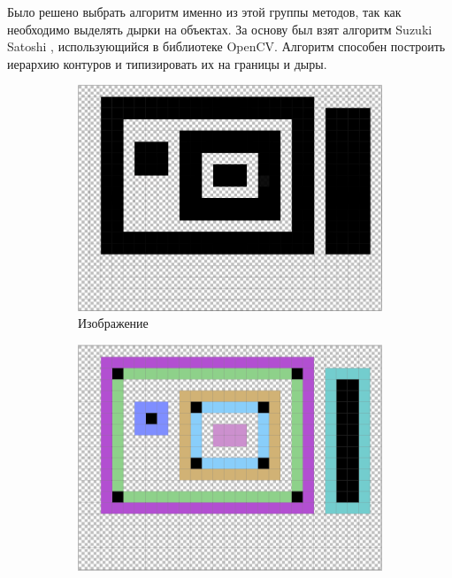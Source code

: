 \documentclass{fefu_thesis/cls/fefu}
\begin{document}
    Было решено выбрать алгоритм именно из этой группы методов, так как необходимо выделять дырки на объектах. За основу был взят алгоритм Suzuki Satoshi \cite{SuzukiAlgorithm}, использующийся в библиотеке OpenCV. Алгоритм способен построить иерархию контуров и типизировать их на границы и дыры.

    \begin{figure}[H]
        \centering
        \begin{subfigure}[t]{.49\linewidth}
            \includegraphics[scale=0.4]{images/SuzukiExample_upscaled.png}
            \caption{Изображение}
        \end{subfigure}
        \begin{subfigure}[t]{.49\linewidth}
            \includegraphics[scale=0.4]{images/SuzukiExample_contours_upscaled.png}

\end{subfigure}
\end{figure}
\end{document}
